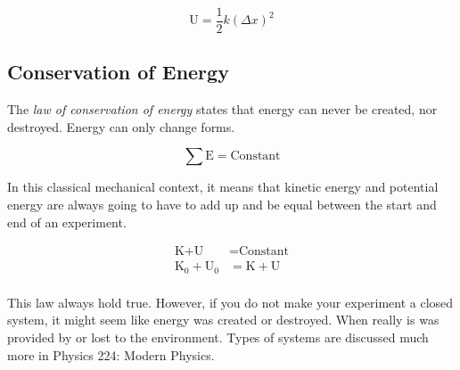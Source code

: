 \begin{equation} \label{eq:Hookes Law and Potential Energy}
  \text{U} = \frac{1}{2} k \left( \Delta x \right)^{2}
\end{equation}

\subsection{Conservation of Energy} \label{subsec:Conservation of Energy}
\begin{definition} \label{def:Conservation of Energy}
  The \emph{law of conservation of energy} states that energy can never be created, nor destroyed.
  Energy can only change forms.

  \begin{equation} \label{eq:Conservation of Energy}
    \sum \text{E} = \text{Constant}
  \end{equation}
  
  In this classical mechanical context, it means that kinetic energy and potential energy are always going to have to add up and be equal between the start and end of an experiment.

  \begin{equation} \label{eq:Mechanical Conservation of Energy}
    \begin{aligned}
      \text{K} + \text{U} &= \text{Constant} \\
      \text{K}_{0} + \text{U}_{0} &= \text{K} + \text{U} \\
    \end{aligned}
  \end{equation}

  \begin{remark}
    This law always hold true.
    However, if you do not make your experiment a closed system, it might seem like energy was created or destroyed.
    When really is was provided by or lost to the environment.
    Types of systems are discussed much more in Physics 224: Modern Physics.
  \end{remark}
\end{definition}

